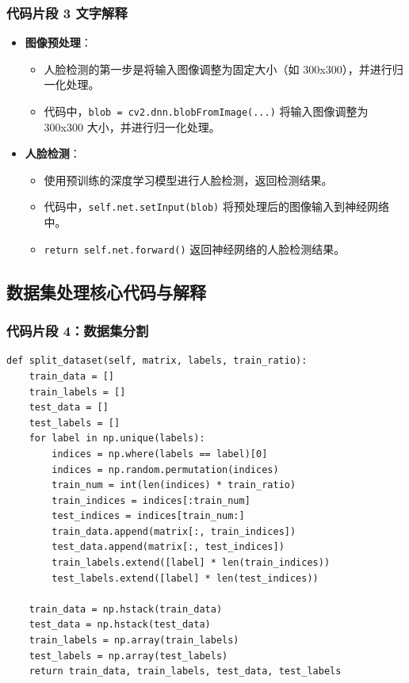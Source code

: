 \documentclass{article}
\begin{document}
\subsubsection{代码片段 3 文字解释}
\begin{itemize}
    \item \textbf{图像预处理}：
    \begin{itemize}
        \item 人脸检测的第一步是将输入图像调整为固定大小（如 300x300），并进行归一化处理。
        \item 代码中，\texttt{blob = cv2.dnn.blobFromImage(...)} 将输入图像调整为 300x300 大小，并进行归一化处理。
    \end{itemize}
    \item \textbf{人脸检测}：
    \begin{itemize}
        \item 使用预训练的深度学习模型进行人脸检测，返回检测结果。
        \item 代码中，\texttt{self.net.setInput(blob)} 将预处理后的图像输入到神经网络中。
        \item \texttt{return self.net.forward()} 返回神经网络的人脸检测结果。
    \end{itemize}
\end{itemize}

\subsection{数据集处理核心代码与解释}

\subsubsection{代码片段 4：数据集分割}
\begin{lstlisting}[basicstyle=\scriptsize\ttfamily, linewidth=\textwidth]
def split_dataset(self, matrix, labels, train_ratio):
    train_data = []
    train_labels = []
    test_data = []
    test_labels = []
    for label in np.unique(labels):
        indices = np.where(labels == label)[0]
        indices = np.random.permutation(indices)
        train_num = int(len(indices) * train_ratio)
        train_indices = indices[:train_num]
        test_indices = indices[train_num:]
        train_data.append(matrix[:, train_indices])
        test_data.append(matrix[:, test_indices])
        train_labels.extend([label] * len(train_indices))
        test_labels.extend([label] * len(test_indices))

    train_data = np.hstack(train_data)
    test_data = np.hstack(test_data)
    train_labels = np.array(train_labels)
    test_labels = np.array(test_labels)
    return train_data, train_labels, test_data, test_labels
\end{lstlisting}
\end{document}
